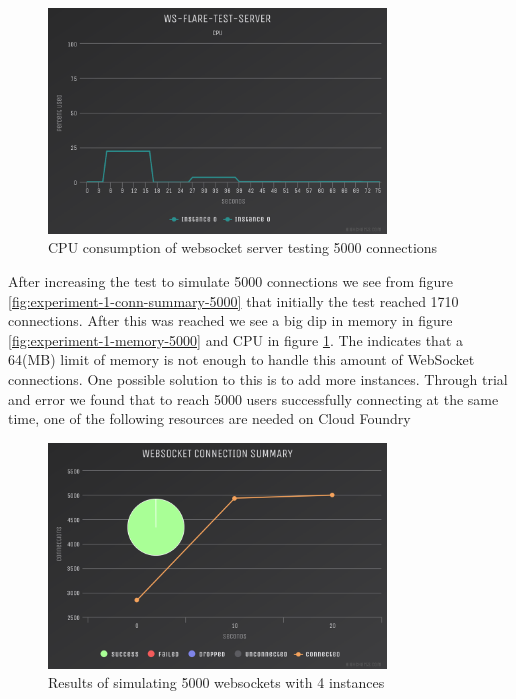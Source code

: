 \begin{figure}[H]
  \centering
    \includegraphics[width=0.8\textwidth]{figures/experiments/experiment-1/node-js/cpu-5000.png}
    \caption{CPU consumption of websocket server testing 5000 connections}
    \label{fig:experiment-1-cpu-5000}
\end{figure}

After increasing the test to simulate 5000 connections we see from figure \ref{fig:experiment-1-conn-summary-5000} that initially the test reached 1710 connections. After this was reached we see a big dip in memory in figure \ref{fig:experiment-1-memory-5000} and CPU in figure \ref{fig:experiment-1-cpu-5000}. The indicates that a 64(MB) limit of memory is not enough to handle this amount of WebSocket connections. One possible solution to this is to add more instances. Through trial and error we found that to reach 5000 users successfully connecting at the same time, one of the following resources are needed on Cloud Foundry

\begin{table}[H]
\caption{Cloud Foundry Resource Limits}
\label{table:cf-resource-limits-3}
\end{table}

\begin{figure}[H]
  \centering
    \includegraphics[width=0.8\textwidth]{figures/experiments/experiment-1/node-js/conn-summary-5000-4-instances.png}
    \caption{Results of simulating 5000 websockets with 4 instances}
    \label{fig:experiment-1-conn-summary-5000-4-instances}
\end{figure}

